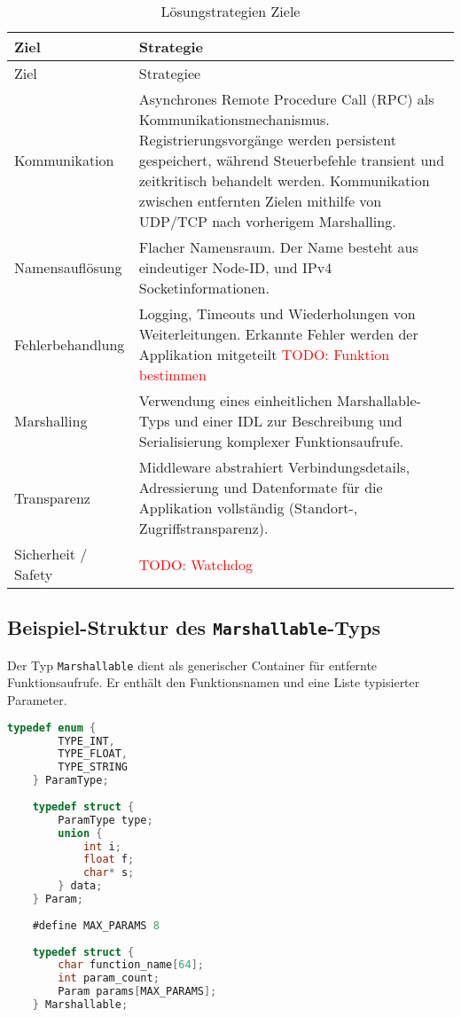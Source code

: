 \begin{longtable}{|>{\raggedright\arraybackslash}p{4cm}|>{\raggedright\arraybackslash}p{10cm}|}
	\caption{Lösungstrategien Ziele} \label{tab:loesungsstrategieZiele} \\
	\hline
	Ziel & Strategie \\
	\hline
	\endfirsthead
	
	\hline
	Ziel & Strategiee\\
	\hline
	\endhead
	
	\hline
	\endfoot
	
	Kommunikation &
	Asynchrones Remote Procedure Call (RPC) als Kommunikationsmechanismus. Registrierungsvorgänge werden persistent gespeichert, während Steuerbefehle transient und zeitkritisch behandelt werden. Kommunikation zwischen entfernten Zielen mithilfe von UDP/TCP nach vorherigem Marshalling.
	\\
	\hline
	Namensauflösung
	& Flacher Namensraum. Der Name besteht aus eindeutiger Node-ID, und IPv4 Socketinformationen. 
	\\
	\hline
	Fehlerbehandlung
	& Logging, Timeouts und Wiederholungen von Weiterleitungen. Erkannte Fehler werden der Applikation mitgeteilt \textcolor{red}{TODO: Funktion bestimmen}
	\\
	\hline
	Marshalling
	& Verwendung eines einheitlichen Marshallable-Typs und einer IDL zur Beschreibung und Serialisierung komplexer Funktionsaufrufe.
	\\
	\hline
	Transparenz
	& Middleware abstrahiert Verbindungsdetails, Adressierung und Datenformate für die Applikation vollständig (Standort-, Zugriffstransparenz).
	\\
	\hline
	Sicherheit / Safety
	& \textcolor{red}{TODO: Watchdog }
	\\
	\hline
	
\end{longtable}

\subsection*{Beispiel-Struktur des \texttt{Marshallable}-Typs}

Der Typ \texttt{Marshallable} dient als generischer Container für entfernte Funktionsaufrufe. Er enthält den Funktionsnamen und eine Liste typisierter Parameter.

\begin{lstlisting}[language=C, caption={Definition des \texttt{Marshallable}-Typs}]
	typedef enum {
		TYPE_INT,
		TYPE_FLOAT,
		TYPE_STRING
	} ParamType;
	
	typedef struct {
		ParamType type;
		union {
			int i;
			float f;
			char* s;
		} data;
	} Param;
	
	#define MAX_PARAMS 8
	
	typedef struct {
		char function_name[64];
		int param_count;
		Param params[MAX_PARAMS];
	} Marshallable;
\end{lstlisting}

